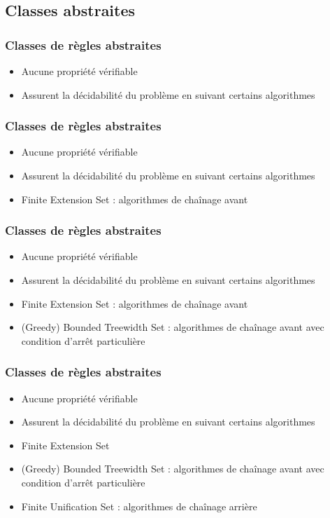 


\subsection{Classes abstraites}

\begin{frame}[t]
	\frametitle{Classes de règles abstraites}
	\vspace{10mm}
	\begin{itemize}
		\item Aucune propriété vérifiable
		\item Assurent la décidabilité du problème en suivant certains algorithmes
	\end{itemize}
\end{frame}

\begin{frame}[t]
	\frametitle{Classes de règles abstraites}
	\vspace{10mm}
	\begin{itemize}
		\item Aucune propriété vérifiable
		\item Assurent la décidabilité du problème en suivant certains algorithmes
		\item Finite Extension Set : algorithmes de chaînage avant
	\end{itemize}
\end{frame}

\begin{frame}[t]
	\frametitle{Classes de règles abstraites}
	\vspace{10mm}
	\begin{itemize}
		\item Aucune propriété vérifiable
		\item Assurent la décidabilité du problème en suivant certains algorithmes
		\item Finite Extension Set : algorithmes de chaînage avant
		\item (Greedy) Bounded Treewidth Set : algorithmes de chaînage avant avec condition
		d'arrêt particulière
	\end{itemize}
\end{frame}

\begin{frame}[t]
	\frametitle{Classes de règles abstraites}
	\vspace{10mm}
	\begin{itemize}
		\item Aucune propriété vérifiable
		\item Assurent la décidabilité du problème en suivant certains algorithmes
		\item Finite Extension Set
		\item (Greedy) Bounded Treewidth Set : algorithmes de chaînage avant avec condition
			d'arrêt particulière
		\item Finite Unification Set : algorithmes de chaînage arrière
	\end{itemize}
\end{frame}

